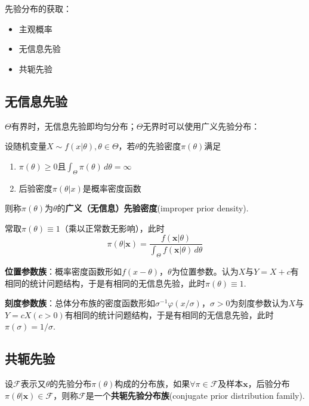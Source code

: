 \documentclass{ctexbook}
\begin{document}
先验分布的获取：\begin{itemize}
    \item 主观概率
    \item 无信息先验
    \item 共轭先验
\end{itemize}

\subsection{无信息先验}

$\Theta$有界时，无信息先验即均匀分布；$\Theta$无界时可以使用广义先验分布：

\begin{definition}
    设随机变量$X\sim f(x|\theta),\theta\in\Theta$，若$\theta$的先验密度$\pi(\theta)$满足\begin{enumerate}
        \item $\pi(\theta)\ge 0$且$\int_{\Theta}\pi(\theta)\,d\theta=\infty$
        \item 后验密度$\pi(\theta|x)$是概率密度函数
        \end{enumerate}
        则称$\pi(\theta)$为$\theta$的\textbf{广义（无信息）先验密度}(improper prior density).
\end{definition}

常取$\pi(\theta)\equiv 1$（乘以正常数无影响），此时
$$\pi(\theta|\mathbf{x})=\frac{f(\mathbf{x}|\theta)}{\int_{\Theta}f(\mathbf{x}|\theta)\,d\theta}$$

\textbf{位置参数族}：概率密度函数形如$f(x-\theta)$，$\theta$为位置参数。认为$X$与$Y=X+c$有相同的统计问题结构，于是有相同的无信息先验，此时$\pi(\theta)\equiv 1$.

\textbf{刻度参数族}：总体分布族的密度函数形如$\sigma^{-1}\varphi(x/\sigma)$，$\sigma>0$为刻度参数认为$X$与$Y=cX(c>0)$有相同的统计问题结构，于是有相同的无信息先验，此时$\pi(\sigma)=1/\sigma$.

\subsection{共轭先验}

\begin{definition}
    设$\mathcal{F}$表示又$\theta$的先验分布$\pi(\theta)$构成的分布族，如果$\forall \pi\in\mathcal{F} $及样本$\mathbf{x}$，后验分布$\pi(\theta|\mathbf{x})\in\mathcal{F}$，则称$\mathcal{F}$是一个\textbf{共轭先验分布族}(conjugate prior distribution family).
\end{definition}
\end{document}
